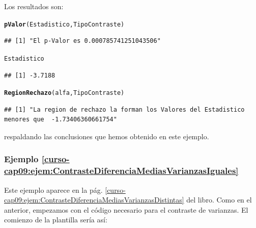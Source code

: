 \documentclass[10pt,a4paper]{article}\usepackage[]{graphicx}\usepackage[]{color}
\makeatletter
\newcommand{\hlstd}[1]{\textcolor[rgb]{0.345,0.345,0.345}{#1}}%
\newcommand{\hlkwd}[1]{\textcolor[rgb]{0.737,0.353,0.396}{\textbf{#1}}}%
\newenvironment{kframe}{%
 \def\at@end@of@kframe{}%
 \ifinner\ifhmode%
  \def\at@end@of@kframe{\end{minipage}}%
  \begin{minipage}{\columnwidth}%
 \fi\fi%
 \def\FrameCommand##1{\hskip\@totalleftmargin \hskip-\fboxsep
 \colorbox{shadecolor}{##1}\hskip-\fboxsep
     \hskip-\linewidth \hskip-\@totalleftmargin \hskip\columnwidth}%
 \MakeFramed {\advance\hsize-\width
   \@totalleftmargin\z@ \linewidth\hsize
   \@setminipage}}%
 {\par\unskip\endMakeFramed%
 \at@end@of@kframe}
\newenvironment{knitrout}{}{} %
\newcounter {cont01}
\makeatother
\begin{document}
Los resultados son:
\begin{knitrout}
\color{fgcolor}\begin{kframe}
\begin{alltt}
     \hlkwd{pValor}\hlstd{(Estadistico, TipoContraste)}
\end{alltt}
\begin{verbatim}
## [1] "El p-Valor es 0.000785741251043506"
\end{verbatim}
\begin{alltt}
     \hlstd{Estadistico}
\end{alltt}
\begin{verbatim}
## [1] -3.7188
\end{verbatim}
\begin{alltt}
     \hlkwd{RegionRechazo}\hlstd{(alfa, TipoContraste)}
\end{alltt}
\begin{verbatim}
## [1] "La region de rechazo la forman los Valores del Estadistico menores que  -1.73406360661754"
\end{verbatim}
\end{kframe}
\end{knitrout}
respaldando las conclusiones que hemos obtenido en este ejemplo.

\subsubsection*{Ejemplo \ref{curso-cap09:ejem:ContrasteDiferenciaMediasVarianzasIguales}}

Este ejemplo aparece en la pág. \ref{curso-cap09:ejem:ContrasteDiferenciaMediasVarianzasDistintas} del libro. Como en el anterior, empezamos con el código necesario para el contraste de varianzas. El comienzo de la plantilla sería así:
\end{document}
